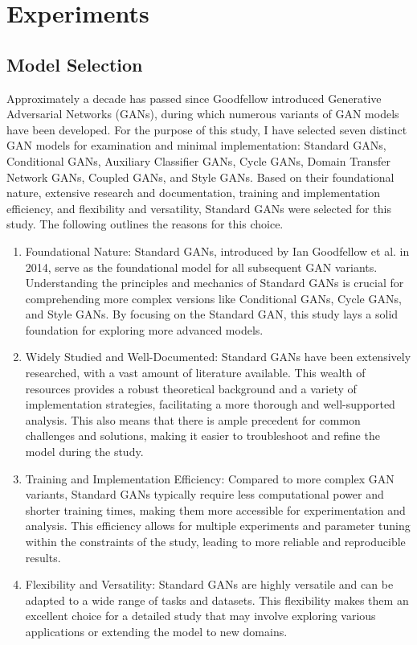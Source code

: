 \chapter{Experiments}
\label{Experiments}


\section{Model Selection}
Approximately a decade has passed since Goodfellow introduced Generative Adversarial Networks (GANs), 
during which numerous variants of GAN models have been developed. For the purpose of this study, 
I have selected seven distinct GAN models for examination and minimal implementation: Standard GANs, 
Conditional GANs, Auxiliary Classifier GANs, Cycle GANs, Domain Transfer Network GANs, Coupled GANs, 
and Style GANs. Based on their foundational nature, extensive research and documentation, training and 
implementation efficiency, and flexibility and versatility, Standard GANs were selected for this study. 
The following outlines the reasons for this choice.


\begin{enumerate}
    \item Foundational Nature: Standard GANs, introduced by Ian Goodfellow et al. in 2014, serve as the 
    foundational model for all subsequent GAN variants. Understanding the principles and mechanics of 
    Standard GANs is crucial for comprehending more complex versions like Conditional GANs, Cycle GANs, 
    and Style GANs. By focusing on the Standard GAN, this study lays a solid foundation for exploring more advanced models.

    \item Widely Studied and Well-Documented: Standard GANs have been extensively researched, with a 
    vast amount of literature available. This wealth of resources provides a robust theoretical 
    background and a variety of implementation strategies, facilitating a more thorough and 
    well-supported analysis. This also means that there is ample precedent for common challenges 
    and solutions, making it easier to troubleshoot and refine the model during the study.

    \item Training and Implementation Efficiency: Compared to more complex GAN variants, 
    Standard GANs typically require less computational power and shorter training times, 
    making them more accessible for experimentation and analysis. This efficiency allows 
    for multiple experiments and parameter tuning within the constraints of the study, 
    leading to more reliable and reproducible results.

    \item Flexibility and Versatility: Standard GANs are highly versatile and can be adapted 
    to a wide range of tasks and datasets. This flexibility makes them an excellent choice for 
    a detailed study that may involve exploring various applications or extending the model to new domains.
\end{enumerate}



